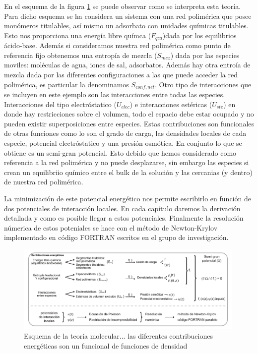 En el esquema de la figura \ref{fig:met:tm_esquema} se puede observar como se interpreta esta teor\'ia. Para dicho esquema se ha considera un sistema con una red polim\'erica que posee mon\'omeros titulables, as\'i mismo un adsorbato con unidades qu\'imicas titulables. Esto nos proporciona una energ\'ia libre qu\'imca ($F_{qca}$)dada por los equilibrios \'acido-base.
Adem\'as si consideramos nuestra red polim\'erica como punto de referencia fijo obtenemos una entrop\'ia de mezcla ($S_{mez}$) dada por las especies moviles: mol\'eculas de agua, iones de sal, adsorbatos. Adem\'as hay otra entro\'ia de mezcla dada por las diferentes configuraciones a las que puede acceder la red polim\'erica, es particular la denominamos $S_{conf,net}$.
Otro tipo de interacciones que se incluyen en este ejemplo son las interacciones entre todas las especies. Interacciones del tipo electr\'ostatico ($U_{elec}$) e interacciones est\'ericas ($U_{ste}$) en donde hay restricciones sobre el volumen, todo el espacio debe estar ocupado y no pueden existir superposiciones entre especies. 
Estas contribuciones son funcionales de otras funciones como lo son el grado de carga, las densidades locales de cada especie, potencial electr\'ostatico y una presi\'on osm\'otica. En conjunto lo que se obtiene es un semi-gran potencial. Esto debido que hemos considerado como referencia a la red polim\'erica y no puede desplazarse, sin embargo las especies si crean un equilibriio qu\'imico entre el bulk de la soluci\'on y las cercanias (y dentro) de nuestra red polim\'erica.

La minimizaci\'on de este potencial energ\'etico nos permite escribirlo en funci\'on de dos potenciales de interacci\'on locales. En cada cap\'itulo daremos la derivaci\'on detallada y como es posible llegar a estos potenciales. 
Finalmente la resoluci\'on n\'umerica de estos poteniales se hace con el m\'etodo de Newton-Krylov \cite{brown1994convergence} implementado en c\'odigo FORTRAN escritos en el grupo de investigaci\'on.
 \begin{figure}[!htb]
	\centering
	\includegraphics[width=0.99\textwidth]{Figures/TM.pdf}
	\caption{Esquema de la teor\'ia molecular... las diferentes contribuciones energ\'eticas son un funcional de funciones de densidad}
	\label{fig:met:tm_esquema}
\end{figure}


